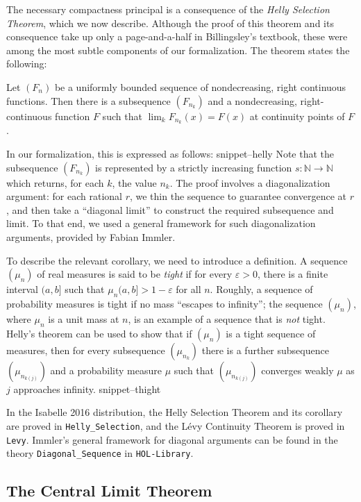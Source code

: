 \documentclass{svjour3}
\newcommand{\NN}{\mathbb{N}}
\newcommand{\Snippet}[1]{\csname snippet--#1\endcsname}
\begin{document}
The necessary compactness principal is a consequence of the \emph{Helly Selection Theorem}, which we now describe. Although the proof of this theorem and its consequence take up only a page-and-a-half in Billingsley's textbook, these were among the most subtle components of our formalization. The theorem states the following:
\begin{theorem}
Let $(F_n)$ be a uniformly bounded sequence of nondecreasing, right continuous functions. Then there is a subsequence $(F_{n_k})$ and a nondecreasing, right-continuous function $F$ such that $\lim_k F_{n_k}(x) = F(x)$ at continuity points of $F$.  
\end{theorem}
In our formalization, this is expressed as follows:
\Snippet{helly}
Note that the subsequence $(F_{n_k})$ is represented by a strictly increasing function $s : \NN \to \NN$ which returns, for each $k$, the value $n_k$. The proof involves a diagonalization argument: for each rational $r$, we thin the sequence to guarantee convergence at $r$, and then take a ``diagonal limit'' to construct the required subsequence and limit. To that end, we used a general framework for such diagonalization arguments, provided by Fabian Immler.

To describe the relevant corollary, we need to introduce a definition. A sequence $(\mu_n)$ of real measures is said to be \emph{tight} if for every $\varepsilon > 0$, there is a finite interval $(a, b]$ such that $\mu_n(a, b] > 1 - \varepsilon$ for all $n$. Roughly, a sequence of probability measures is tight if no mass ``escapes to infinity''; the sequence $(\mu_n)$, where $\mu_n$ is a unit mass at $n$, is an example of a sequence that is \emph{not} tight. Helly's theorem can be used to show that if $(\mu_n)$ is a tight sequence of measures, then for every subsequence $(\mu_{n_k})$ there is a further subsequence $(\mu_{n_{k(j)}})$ and a probability measure $\mu$ such that $(\mu_{n_{k(j)}})$ converges weakly $\mu$ as $j$ approaches infinity.
\Snippet{thight}

In the Isabelle 2016 distribution, the Helly Selection Theorem and its corollary are proved in \verb=Helly_Selection=, and the L\'evy Continuity Theorem is proved in \texttt{Levy}. Immler's general framework for diagonal arguments can be found in the theory \verb=Diagonal_Sequence= in \texttt{HOL-Library}.

\subsection{The Central Limit Theorem}
\end{document}
